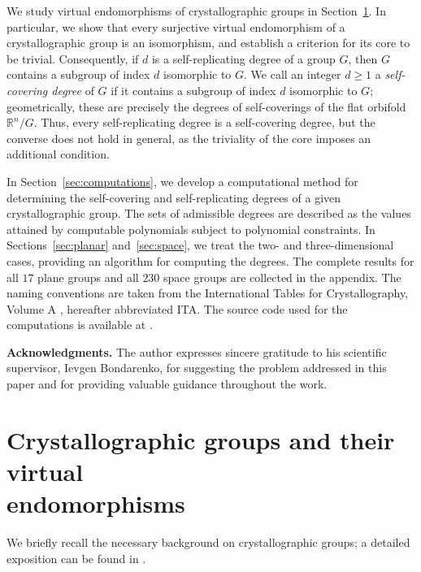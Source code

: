 \documentclass[draft]{adm-paper}
\theoremstyle{definition}
\begin{document}
We study virtual endomorphisms of crystallographic groups in Section~\ref{sec:cryst}. In particular, we show that every
surjective virtual endomorphism of a crystallographic group is an isomorphism, and establish a criterion for its core
to be trivial. Consequently, if $d$ is a self-replicating degree of a group $G$, then $G$ contains a subgroup of
index $d$ isomorphic to $G$. We call an integer $d\geq 1$ a \emph{self-covering degree} of $G$ if it contains a
subgroup of index $d$ isomorphic to $G$; geometrically, these are precisely the degrees of self-coverings of the flat
orbifold $\mathbb{R}^n/G$. Thus, every self-replicating degree is a self-covering degree, but the converse does not
hold in general, as the triviality of the core imposes an additional condition.

In Section~\ref{sec:computations}, we develop a computational method for determining the self-covering and self-replicating
degrees of a given crystallographic group. The sets of admissible degrees are described as the values attained by
computable polynomials subject to polynomial constraints. In Sections~\ref{sec:planar} and~\ref{sec:space}, we treat
the two- and three-dimensional cases, providing an algorithm for computing the degrees. The complete results for all
$17$ plane groups and all $230$ space groups are collected in the appendix. The naming conventions are taken from the
International Tables for Crystallography, Volume A \cite{CrystTables}, hereafter abbreviated ITA.
The source code used for the computations is available at \cite{crystcode2026}.

\vspace{0.2cm}
\textbf{Acknowledgments.} The author expresses sincere gratitude to his scientific supervisor, Ievgen Bondarenko,
for suggesting the problem addressed in this paper and for providing valuable guidance throughout the work.


\section{Crystallographic groups and their virtual \\ endomorphisms}\label{sec:cryst}

We briefly recall the necessary background on crystallographic groups; a detailed exposition can be found in \cite{Szcz:CrystBook}.
\end{document}
